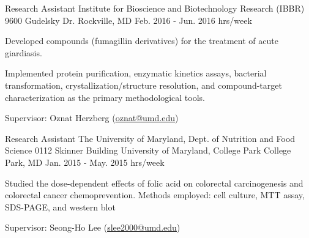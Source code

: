 \begin{cventries}
  \cventry
    {Research Assistant} %
    {Institute for Bioscience and Biotechnology Research (IBBR) } %
    {9600 Gudelsky Dr. \newline
Rockville, MD} %
    {Feb. 2016 - Jun. 2016  hrs/week} %
    {
      \begin{cvitems} %
        \item {Developed compounds (fumagillin derivatives) for the treatment of acute giardiasis.}
        \item{Implemented protein purification, enzymatic kinetics assays, bacterial transformation, crystallization/structure resolution, and compound-target characterization as the primary methodological tools.}
        \item{Supervisor: Oznat Herzberg (\textcolor{navyblue}{
        {\underline{\href{mailto:oznat@umd.edu}{oznat@umd.edu}}}})}
      \end{cvitems}
    }


  \cventry
    {Research Assistant} %
    {The University of Maryland, Dept. of Nutrition and Food Science} %
    {0112 Skinner Building \newline
University of Maryland, College Park \newline
College Park, MD} %
    {Jan. 2015 - May. 2015  hrs/week} %
    {
      \begin{cvitems} %
        \item {Studied the dose-dependent effects of folic acid on colorectal carcinogenesis and colorectal cancer chemoprevention. Methods employed: cell culture, MTT assay, SDS-PAGE, and western blot}
        \item{Supervisor: Seong-Ho Lee (\textcolor{navyblue}{
        {\underline{\href{mailto:slee2000@umd.edu}{slee2000@umd.edu}}}})}
      \end{cvitems}
    }



\end{cventries}
